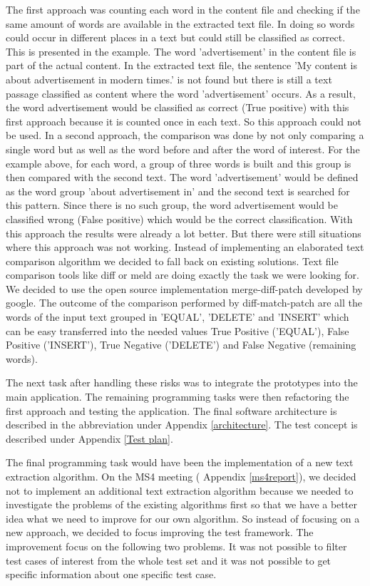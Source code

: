 The first approach was counting each word in the content file and checking if the same amount of words are available in the extracted text file. In doing so words could occur in different places in a text but could still be classified as correct. This is presented in the example. The word 'advertisement' in the content file is part of the actual content. In the extracted text file, the sentence 'My content is about advertisement in modern times.' is not found but there is still a text passage classified as content where the word 'advertisement' occurs. As a result, the word advertisement would be classified as correct (True positive) with this first approach because it is counted once in each text. So this approach could not be used.
In a second approach, the comparison was done by not only comparing a single word but as well as the word before and after the word of interest. 
For the example above, for each word, a group of three words is built and this group is then compared with the second text. The word 'advertisement' would be defined as the word group 'about advertisement in' and the second text is searched for this pattern. Since there is no such group, the word advertisement would be classified wrong (False positive) which would be the correct classification. With this approach the results were already a lot better. But there were still situations where this approach was not working. Instead of implementing an elaborated text comparison algorithm we decided to fall back on existing solutions. Text file comparison tools like diff \cite{wiki:diff} or meld \cite{wiki:meld} are doing exactly the task we were looking for. We decided to use the open source implementation merge-diff-patch \cite{google:diffMatchPatch} developed by google.  The outcome of the comparison performed by diff-match-patch are all the words of the input text grouped in 'EQUAL', 'DELETE' and 'INSERT' which can be easy transferred into the needed values True Positive ('EQUAL'), False Positive ('INSERT'), True Negative ('DELETE') and False Negative (remaining words). 


The next task after handling these risks was to integrate the prototypes into the main application. The remaining programming tasks were then refactoring the first approach and testing the application. The final software architecture is described in the abbreviation under Appendix \ref{architecture}. The test concept is described under Appendix \ref{Test plan}. 

The final programming task would have been the implementation of a new text extraction algorithm. On the MS4 meeting ( Appendix \ref{ms4report}), we decided not to implement an additional text extraction algorithm because we needed to investigate the problems of the existing algorithms first so that we have a better idea what we need to improve for our own algorithm. So instead of focusing on a new approach, we decided to focus improving the test framework. 
The improvement focus on the following two problems. It was not possible to filter test cases of interest from the whole test set and it was not possible to get specific information about one specific test case.

